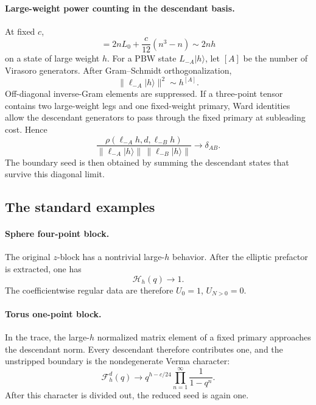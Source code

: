 \documentclass[11pt]{article}
\newcommand{\F}{\mathcal F}
\newcommand{\Hh}{\mathcal H}
\begin{document}
\paragraph{Large-weight power counting in the descendant basis.}
At fixed \(c\),
\begin{equation}
 [L_n,L_{-n}]
 =
 2nL_0+\frac{c}{12}(n^3-n)
 \sim 2nh
 \label{eq:large-h-commutator}
\end{equation}
on a state of large weight \(h\).  For a PBW state \(L_{-A}|h\rangle\), let
\([A]\) be the number of Virasoro generators.  After Gram--Schmidt
orthogonalization,
\begin{equation}
 \|\ell_{-A}|h\rangle\|^2\sim h^{[A]}.
 \label{eq:large-h-norm}
\end{equation}
Off-diagonal inverse-Gram elements are suppressed.  If a three-point tensor
contains two large-weight legs and one fixed-weight primary, Ward identities
allow the descendant generators to pass through the fixed primary at
subleading cost.  Hence
\begin{equation}
 \frac{
 \rho(\ell_{-A}h,d,\ell_{-B}h)}
 {\|\ell_{-A}|h\rangle\|\,
  \|\ell_{-B}|h\rangle\|}
 \longrightarrow \delta_{AB}.
 \label{eq:large-h-diagonal-vertex}
\end{equation}
The boundary seed is then obtained by summing the descendant states that
survive this diagonal limit.

\subsection{The standard examples}

\paragraph{Sphere four-point block.}
The original \(z\)-block has a nontrivial large-\(h\) behavior.  After the
elliptic prefactor is extracted, one has
\begin{equation}
 \Hh_h(q)\longrightarrow1.
 \label{eq:sphere-h-boundary}
\end{equation}
The coefficientwise regular data are therefore
\(U_0=1\), \(U_{N>0}=0\).

\paragraph{Torus one-point block.}
In the trace, the large-\(h\) normalized matrix element of a fixed primary
approaches the descendant norm.  Every descendant therefore contributes
one, and the unstripped boundary is the nondegenerate Verma character:
\begin{equation}
 \F_h^d(q)
 \longrightarrow
 q^{h-c/24}
 \prod_{n=1}^{\infty}\frac1{1-q^n}.
 \label{eq:torus-character-boundary}
\end{equation}
After this character is divided out, the reduced seed is again one.
\end{document}
